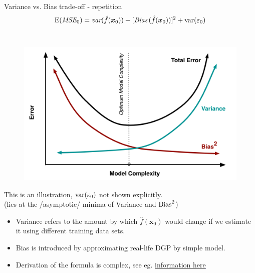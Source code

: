 \documentclass{beamer}
\begin{document}
\begin{frame}{Variance vs. Bias trade-off - repetition}
\vspace{-0.5cm}
$$\textnormal{E}(\textit{MSE}_0)
   = \textit{var}(\hat{f}(\bm{x}_0))
   + [\textit{Bias\,}(\hat{f}(\bm{x}_0))]^2
   + \textnormal{var}(\varepsilon_0)$$\\
\begin{figure}
\includegraphics[angle=0,scale=0.30]{IMG/biasvariance.png}
\end{figure}
\small{This is an illustration, $\textnormal{var}(\varepsilon_0)$ not shown explicitly. \\(lies at the /asymptotic/ minima of Variance and $\textnormal{Bias}^2$)}\\
\small{
\begin{itemize}
    \item Variance refers to the amount by which $\hat{f}(\bm{x}_0)$ would change if we estimate it using different training data sets.   
    \item Bias is introduced by approximating real-life DGP by simple model.
    \item Derivation of the formula is complex, see eg. \textcolor{blue}{\underline{\href{https://stats.stackexchange.com/questions/204115/understanding-bias-variance-tradeoff-derivation}{information here}}}
\end{itemize}}
\end{frame}
\end{document}
